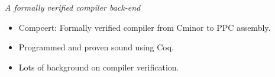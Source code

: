 \begin{frame}{\citet[Journal of Automated Reasoning][]{leroy2009formally}}
\emph{A formally verified compiler back-end}
\begin{itemize}
	\item Compcert: Formally verified compiler from Cminor to PPC assembly.
    \item Programmed and proven sound using Coq.
    \item Lots of background on compiler verification.
\end{itemize}
\end{frame}
